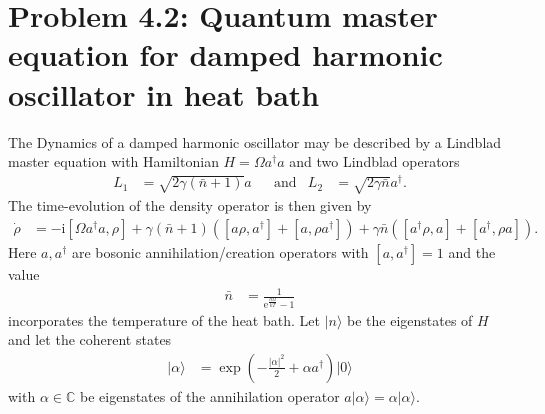 \documentclass[english, parskip=full]{scrartcl}
\newcommand{\kla}{}
\newcommand{\klam}{}
\newcommand{\tecxt}{}
\newcommand{\Ket}{}
\renewcommand{\i}{\text{i}}
\newcommand{\e}{\text{e}}
\begin{document}
\newpage
\section*{Problem 4.2: Quantum master equation for damped harmonic oscillator in heat bath}
The Dynamics of a damped harmonic oscillator may be described by a Lindblad master equation with Hamiltonian $H = \Omega a^\dagger a$ and two Lindblad operators
\begin{align}
L_1 &= \sqrt{2\gamma \kla\left( \bar{n}+1 \right)} a &&\tecxt\text{and}& L_2 &= \sqrt{2\gamma\bar{n}} a^\dagger.
\end{align}
The time-evolution of the density operator is then given by
\begin{align}
\dot{\rho} &= -\i\klam\left[ \Omega a^\dagger a,\rho \right] + \gamma\kla\left( \bar{n}+1 \right)\kla\left( \klam\left[ a\rho,a^\dagger \right] + \klam\left[ a,\rho a^\dagger \right] \right) + \gamma\bar{n} \kla\left( \klam\left[ a^\dagger \rho, a \right] + \klam\left[ a^\dagger, \rho a \right] \right).
\end{align}
Here $a,a^\dagger$ are bosonic annihilation/creation operators with $\klam\left[ a,a^\dagger \right] = 1$ and the value
\begin{align}
\bar{n} &= \frac{1}{\e^{\frac{\hbar\Omega}{kT}} - 1}
\end{align}
incorporates the temperature of the heat bath.
Let $\Ket | n \rangle$ be the eigenstates of $H$ and let the coherent states
\begin{align}
\Ket | \alpha \rangle &= \exp\kla\left( -\frac{|\alpha|^2}{2} + \alpha a^\dagger \right)\Ket | 0 \rangle
\end{align}
with $\alpha\in\mathbb{C}$ be eigenstates of the annihilation operator $a\Ket | \alpha \rangle = \alpha\Ket | \alpha \rangle$.
\end{document}
